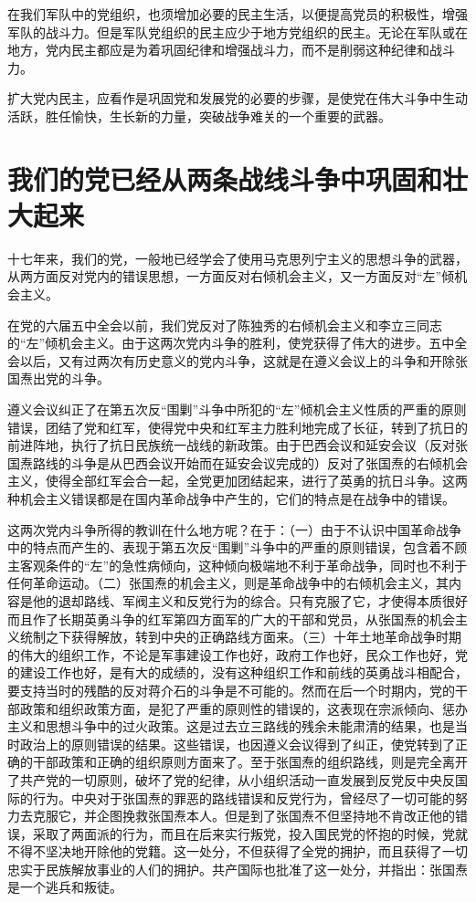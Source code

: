 在我们军队中的党组织，也须增加必要的民主生活，以便提高党员的积极性，增强军队的战斗力。但是军队党组织的民主应少于地方党组织的民主。无论在军队或在地方，党内民主都应是为着巩固纪律和增强战斗力，而不是削弱这种纪律和战斗力。

扩大党内民主，应看作是巩固党和发展党的必要的步骤，是使党在伟大斗争中生动活跃，胜任愉快，生长新的力量，突破战争难关的一个重要的武器。

\section{我们的党已经从两条战线斗争中巩固和壮大起来}

十七年来，我们的党，一般地已经学会了使用马克思列宁主义的思想斗争的武器，从两方面反对党内的错误思想，一方面反对右倾机会主义，又一方面反对“左”倾机会主义。

在党的六届五中全会以前，我们党反对了陈独秀的右倾机会主义和李立三同志的“左”倾机会主义。由于这两次党内斗争的胜利，使党获得了伟大的进步。五中全会以后，又有过两次有历史意义的党内斗争，这就是在遵义会议上的斗争和开除张国焘出党的斗争。

遵义会议纠正了在第五次反“围剿”斗争中所犯的“左”倾机会主义性质的严重的原则错误，团结了党和红军，使得党中央和红军主力胜利地完成了长征，转到了抗日的前进阵地，执行了抗日民族统一战线的新政策。由于巴西会议和延安会议（反对张国焘路线的斗争是从巴西会议开始而在延安会议完成的）反对了张国焘的右倾机会主义，使得全部红军会合一起，全党更加团结起来，进行了英勇的抗日斗争。这两种机会主义错误都是在国内革命战争中产生的，它们的特点是在战争中的错误。

这两次党内斗争所得的教训在什么地方呢？在于：（一）由于不认识中国革命战争中的特点而产生的、表现于第五次反“围剿”斗争中的严重的原则错误，包含着不顾主客观条件的“左”的急性病倾向，这种倾向极端地不利于革命战争，同时也不利于任何革命运动。（二）张国焘的机会主义，则是革命战争中的右倾机会主义，其内容是他的退却路线、军阀主义和反党行为的综合。只有克服了它，才使得本质很好而且作了长期英勇斗争的红军第四方面军的广大的干部和党员，从张国焘的机会主义统制之下获得解放，转到中央的正确路线方面来。（三）十年土地革命战争时期的伟大的组织工作，不论是军事建设工作也好，政府工作也好，民众工作也好，党的建设工作也好，是有大的成绩的，没有这种组织工作和前线的英勇战斗相配合，要支持当时的残酷的反对蒋介石的斗争是不可能的。然而在后一个时期内，党的干部政策和组织政策方面，是犯了严重的原则性的错误的，这表现在宗派倾向、惩办主义和思想斗争中的过火政策。这是过去立三路线的残余未能肃清的结果，也是当时政治上的原则错误的结果。这些错误，也因遵义会议得到了纠正，使党转到了正确的干部政策和正确的组织原则方面来了。至于张国焘的组织路线，则是完全离开了共产党的一切原则，破坏了党的纪律，从小组织活动一直发展到反党反中央反国际的行为。中央对于张国焘的罪恶的路线错误和反党行为，曾经尽了一切可能的努力去克服它，并企图挽救张国焘本人。但是到了张国焘不但坚持地不肯改正他的错误，采取了两面派的行为，而且在后来实行叛党，投入国民党的怀抱的时候，党就不得不坚决地开除他的党籍。这一处分，不但获得了全党的拥护，而且获得了一切忠实于民族解放事业的人们的拥护。共产国际也批准了这一处分，并指出：张国焘是一个逃兵和叛徒。

